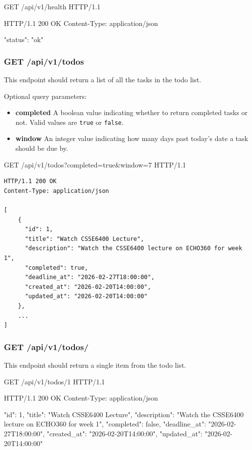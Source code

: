 \documentclass{csse4400}
\begin{document}
\begin{code}[language=json,numbers=none]{}
GET /api/v1/health HTTP/1.1
\end{code}
\begin{code}[language=json,numbers=none]{}
HTTP/1.1 200 OK
Content-Type: application/json

{
  "status": "ok"
}
\end{code}

\subsubsection{GET /api/v1/todos}
This endpoint should return a list of all the tasks in the todo list.

Optional query parameters:
\begin{itemize}
\item \textbf{completed} A boolean value indicating whether to return completed tasks or not. Valid values are \texttt{true} or \texttt{false}.
  \item\textbf{window} An integer value indicating how many days past today's date a task should be due by.
\end{itemize}

\begin{code}[language=json,numbers=none]{}
GET /api/v1/todos?completed=true&window=7 HTTP/1.1
\end{code}

\begin{verbatim}
HTTP/1.1 200 OK
Content-Type: application/json

[
    {
      "id": 1,
      "title": "Watch CSSE6400 Lecture",
      "description": "Watch the CSSE6400 lecture on ECHO360 for week 1",
      "completed": true,
      "deadline_at": "2026-02-27T18:00:00",
      "created_at": "2026-02-20T14:00:00",
      "updated_at": "2026-02-20T14:00:00"
    },
    ...
]
\end{verbatim}

\subsubsection{GET /api/v1/todos/}
This endpoint should return a single item from the todo list.

\begin{code}[language=json,numbers=none]{}
GET /api/v1/todos/1 HTTP/1.1
\end{code}
\begin{code}[language=json,numbers=none]{}
HTTP/1.1 200 OK
Content-Type: application/json

{
    "id": 1,
    "title": "Watch CSSE6400 Lecture",
    "description": "Watch the CSSE6400 lecture on ECHO360 for week 1",
    "completed": false,
    "deadline_at": "2026-02-27T18:00:00",
    "created_at": "2026-02-20T14:00:00",
    "updated_at": "2026-02-20T14:00:00"
}
\end{code}
\end{document}
